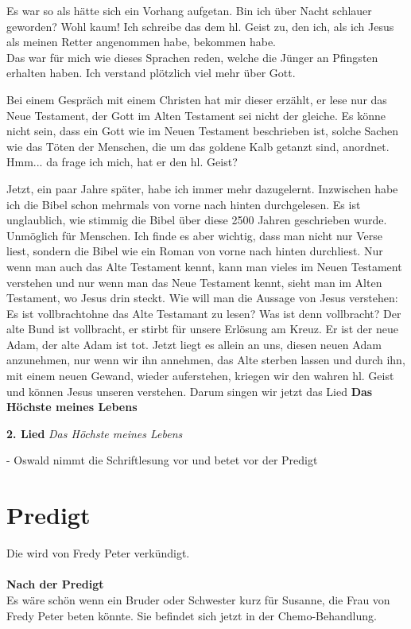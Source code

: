 \documentclass{../inc/mybib}
\begin{document}
Es war so als hätte sich ein Vorhang aufgetan. Bin ich über Nacht schlauer geworden? Wohl kaum! Ich schreibe das dem hl. Geist zu, den ich, als ich Jesus als meinen Retter angenommen habe, bekommen habe.\\
Das war für mich wie dieses Sprachen reden, welche die Jünger an Pfingsten erhalten haben. Ich verstand plötzlich viel mehr über Gott.

Bei einem Gespräch mit einem Christen hat mir dieser erzählt, er lese nur das Neue Testament, der Gott im Alten Testament sei nicht der gleiche. Es könne nicht sein, dass ein Gott wie im Neuen Testament beschrieben ist, solche Sachen wie das Töten der Menschen, die um das goldene Kalb getanzt sind, anordnet. Hmm... da frage ich mich, hat er den hl. Geist? 

Jetzt, ein paar Jahre später, habe ich immer mehr dazugelernt. Inzwischen habe ich die Bibel schon mehrmals von vorne nach hinten durchgelesen. Es ist unglaublich, wie stimmig die Bibel über diese 2500 Jahren geschrieben wurde. Unmöglich für Menschen. Ich finde es aber wichtig, dass man nicht nur Verse liest, sondern die Bibel wie ein Roman von vorne nach hinten durchliest. Nur wenn man auch das Alte Testament kennt, kann man vieles im Neuen Testament verstehen und nur wenn man das Neue Testament kennt, sieht man im Alten Testament, wo Jesus drin steckt. Wie will man die Aussage von Jesus verstehen: \glqq{}Es ist vollbracht\grqq ohne das Alte Testamant zu lesen? Was ist denn vollbracht? Der alte Bund ist vollbracht, er stirbt für unsere Erlösung am Kreuz. Er ist der neue Adam, der alte Adam ist tot. Jetzt liegt es allein an uns, diesen neuen Adam anzunehmen, nur wenn wir ihn annehmen, das Alte sterben lassen und durch ihn, mit einem neuen Gewand, wieder auferstehen, kriegen wir den wahren hl. Geist und können Jesus unseren \herr{} verstehen.
Darum singen wir jetzt das Lied \textbf{Das Höchste meines Lebens}

\textbf{2. Lied} \textit{Das Höchste meines Lebens}

- Oswald nimmt die Schriftlesung vor und betet vor der Predigt

\section{Predigt}
Die wird von Fredy Peter verkündigt.
\\
\\
\textbf{Nach der Predigt}\\
Es wäre schön wenn ein Bruder oder Schwester kurz für Susanne, die Frau von Fredy Peter beten könnte. 
Sie befindet sich jetzt in der Chemo-Behandlung.
\end{document}
